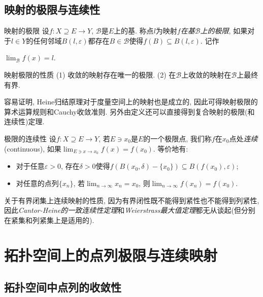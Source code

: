 \subsection{映射的极限与连续性}

\begin{definition}{映射的极限}
	设$f: X \supseteq E \to Y$, $\mathcal{B}$是$E$上的基. 称点$l$为映射$f$\textit{在基$\mathcal{B}$上的极限}, 如果对于$l \in Y$的任何邻域$B(l,\varepsilon)$都存在$B \in \mathcal{B}$使得$f(B) \subseteq B(l,\varepsilon)$. 记作
	\begin{center}
		$\displaystyle \lim_{\mathcal{B}}f(x)=l.$
	\end{center}
\end{definition}

\begin{proposition}{映射极限的性质}
	(1) 收敛的映射存在唯一的极限. \qquad (2) 在$\mathcal{B}$上收敛的映射在$\mathcal{B}$上最终有界. 
\end{proposition}

容易证明, Heine归结原理对于度量空间上的映射也是成立的, 因此可得映射极限的算术运算规则和Cauchy收敛准则. 另外由定义还可以直接得到复合映射的极限(和连续性)定理. 

\begin{definition}{极限的连续性}
	设$f:X \supseteq E \to Y$, 若$E \ni x_0$是$E$的一个极限点, 我们称$f$在$x_0$点处\textit{连续}(continuous), 如果$\lim_{E \ni x \to x_0} f(x) = f(x_0)$. 等价地有: 
	\begin{itemize}
		\item 对于任意$\varepsilon >0$, 存在$\delta >0$使得$f(B(x_0,\delta) - \{ x_0 \}) \subseteq B(f(x_0),\varepsilon)$; 
		\item 对任意的点列$\{ x_n \}$, 若$\lim_{n \to \infty} x_n = x_0$, 则$\lim_{n \to \infty} f(x_n) = f(x_0)$. 
	\end{itemize}
\end{definition}

关于有界闭集上连续映射的性质, 因为有界闭性既不能得到紧性也不能得到列紧性, 因此\textit{Cantor-Heine的一致连续性定理}和\textit{Weierstrass最大值定理}都无从谈起(但分别在紧集和列紧集上是适用的). 



\newpage
\section{拓扑空间上的点列极限与连续映射}

\subsection{拓扑空间中点列的收敛性}


